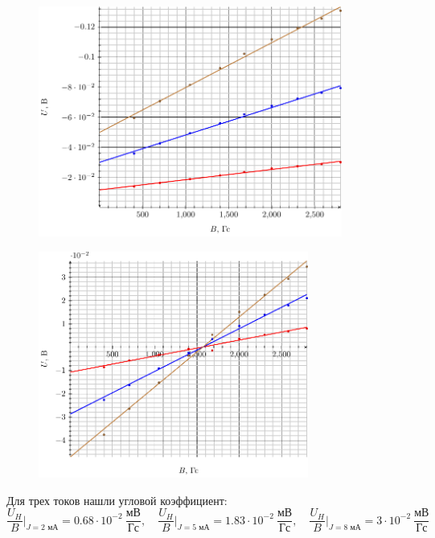 

\begin{figure}[H]
	\centering
	\includegraphics[width=0.89\textwidth]{img/n10m}
	\label{fig:uhp}
\end{figure}

\begin{figure}[H]
	\centering
	\includegraphics[width=0.79\textwidth]{img/n10p}
	\label{fig:uhm}
\end{figure}

Для трех токов нашли угловой коэффициент:
\begin{equation}
	\frac{U_H}{B}\bigg|_{J=2\text{ мА}}=0.68\cdot10^{-2}\ \frac{\text{мВ}}{\text{Гс}},\quad
	\frac{U_H}{B}\bigg|_{J=5\text{ мА}}=1.83\cdot10^{-2}\ \frac{\text{мВ}}{\text{Гс}},\quad
	\frac{U_H}{B}\bigg|_{J=8\text{ мА}}=3\cdot10^{-2}\ \frac{\text{мВ}}{\text{Гс}}
\end{equation}

